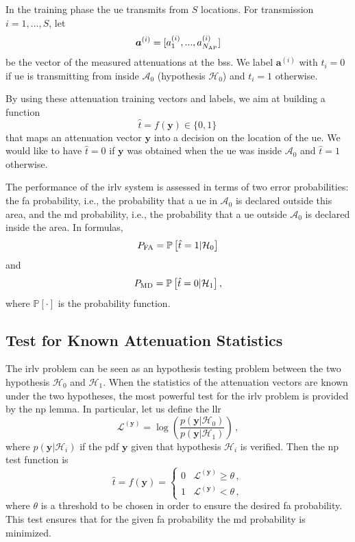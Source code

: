 \documentclass[conference,draftcls,onecolumn]{IEEEtran}
\newcommand{\pr}[1]{\mathbb{P} \left[ #1 \right]}
\begin{document}
In the training phase the \ac{ue} transmits from $S$ locations. For transmission $i=1,...,S$, let
\begin{equation}
    \bm{a}^{(i)}=[a_1^{(i)},...,a_{N_{\rm AP}}^{(i)}]
\end{equation}
be the vector of the measured attenuations at the  \acp{bs}. We label $\bm a ^{(i)}$ with $t_i=0$ if \ac{ue} is transmitting from inside $\mathcal{A}_0$ (hypothesis $\mathcal{H}_0$) and $t_i=1$ otherwise. 

By using these attenuation training vectors and labels, we aim at building a function
\begin{equation}
    \hat{t} = f(\bm{y}) \in \{0,1\}\,
\end{equation}
that maps an attenuation vector $\bm{y}$ into a decision on the location of the \ac{ue}. We would like to have $\hat{t}=0$ if $\bm{y}$ was obtained when the \ac{ue} was inside $\mathcal{A}_0$ and $\hat{t}=1$ otherwise.

The performance of the \ac{irlv} system is assessed in terms of two error probabilities: the \ac{fa} probability, i.e., the probability  that a \ac{ue} in $\mathcal A_0$ is declared outside this area, and the \ac{md} probability, i.e., the probability that a \ac{ue} outside $\mathcal A_0$ is declared inside the area. In formulas, 
\begin{equation}
P_{\rm FA} =\pr{\hat{t} =1 | \mathcal H_0}
\end{equation} 
and  
\begin{equation}
 P_{\rm MD}=\pr{\hat{t} = 0 | \mathcal H_1},   
\end{equation}
where $\pr{\cdot}$ is the probability function.

\subsection{Test for Known Attenuation Statistics}

The \ac{irlv} problem can be seen as an hypothesis testing problem between the two hypothesis $\mathcal H_0$ and $\mathcal H_1$. When the statistics of the attenuation vectors are known under the two hypotheses, the most powerful test for the \ac{irlv} problem is provided by the \ac{np} lemma. In particular, let us  define the \ac{llr}
\begin{equation}\label{eq:lr}
    \mathcal{L}^{(\bm{y})}=\log\left(\frac{p(\bm{y}|\mathcal{H}_0)}{p(\bm{y}|\mathcal{H}_1)}\right)\,,
\end{equation}
where $p(\bm{y}|\mathcal{H}_i)$ if the \ac{pdf} $\bm{y}$ given that hypothesis $\mathcal H_i$ is verified. Then the \ac{np} test function is 
\begin{equation}
\label{eq:thrOpt}
    \hat{t} = f(\bm{y}) = \begin{cases}
    0 & \mathcal{L}^{(\bm{y})} \geq \theta\,, \\ 
    1 & \mathcal{L}^{(\bm{y})} < \theta\,, 
    \end{cases}
\end{equation}
where $\theta$ is a threshold to be chosen in order to ensure the desired \ac{fa} probability. This test ensures that for the given \ac{fa} probability the \ac{md} probability is minimized. 
\end{document}

